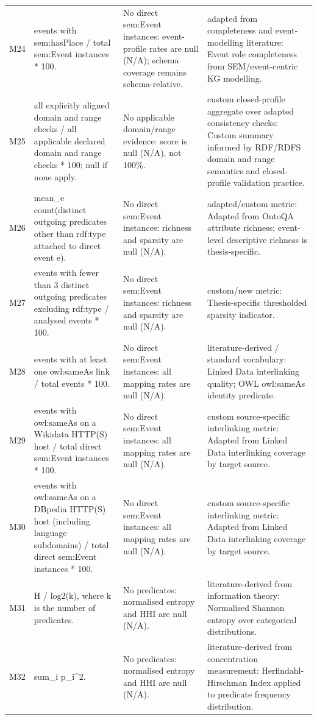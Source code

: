 \begin{longtable}{p{}p{}p{}p{}}
M24 & events with sem:hasPlace / total sem:Event instances * 100. & No direct sem:Event instances: event-profile rates are null (N/A); schema coverage remains schema-relative. & adapted from completeness and event-modelling literature: Event role completeness from SEM/event-centric KG modelling. \\
M25 & all explicitly aligned domain and range checks / all applicable declared domain and range checks * 100; null if none apply. & No applicable domain/range evidence: score is null (N/A), not 100\%. & custom closed-profile aggregate over adapted consistency checks: Custom summary informed by RDF/RDFS domain and range semantics and closed-profile validation practice. \\
M26 & mean\_e count(distinct outgoing predicates other than rdf:type attached to direct event e). & No direct sem:Event instances: richness and sparsity are null (N/A). & adapted/custom metric: Adapted from OntoQA attribute richness; event-level descriptive richness is thesis-specific. \\
M27 & events with fewer than 3 distinct outgoing predicates excluding rdf:type / analysed events * 100. & No direct sem:Event instances: richness and sparsity are null (N/A). & custom/new metric: Thesis-specific thresholded sparsity indicator. \\
M28 & events with at least one owl:sameAs link / total events * 100. & No direct sem:Event instances: all mapping rates are null (N/A). & literature-derived / standard vocabulary: Linked Data interlinking quality; OWL owl:sameAs identity predicate. \\
M29 & events with owl:sameAs on a Wikidata HTTP(S) host / total direct sem:Event instances * 100. & No direct sem:Event instances: all mapping rates are null (N/A). & custom source-specific interlinking metric: Adapted from Linked Data interlinking coverage by target source. \\
M30 & events with owl:sameAs on a DBpedia HTTP(S) host (including language subdomains) / total direct sem:Event instances * 100. & No direct sem:Event instances: all mapping rates are null (N/A). & custom source-specific interlinking metric: Adapted from Linked Data interlinking coverage by target source. \\
M31 & H / log2(k), where k is the number of predicates. & No predicates: normalised entropy and HHI are null (N/A). & literature-derived from information theory: Normalised Shannon entropy over categorical distributions. \\
M32 & sum\_i p\_i\textasciicircum{}2. & No predicates: normalised entropy and HHI are null (N/A). & literature-derived from concentration measurement: Herfindahl-Hirschman Index applied to predicate frequency distribution. \\
\end{longtable}
\endgroup
